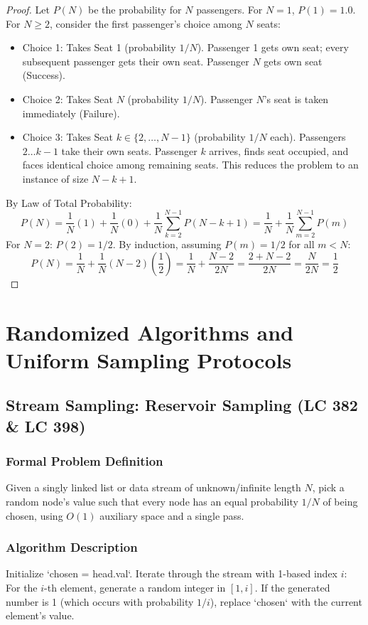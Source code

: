 \documentclass[10pt,journal,compsoc,onecolumn]{IEEEtran}
\begin{document}
\begin{proof}
Let $P(N)$ be the probability for $N$ passengers. For $N=1$, $P(1) = 1.0$.
For $N \ge 2$, consider the first passenger's choice among $N$ seats:
\begin{itemize}
    \item Choice 1: Takes Seat 1 (probability $1/N$). Passenger 1 gets own seat; every subsequent passenger gets their own seat. Passenger $N$ gets own seat (Success).
    \item Choice 2: Takes Seat $N$ (probability $1/N$). Passenger $N$'s seat is taken immediately (Failure).
    \item Choice 3: Takes Seat $k \in \{2, \dots, N-1\}$ (probability $1/N$ each). Passengers $2 \dots k-1$ take their own seats. Passenger $k$ arrives, finds seat occupied, and faces identical choice among remaining seats. This reduces the problem to an instance of size $N - k + 1$.
\end{itemize}
By Law of Total Probability:
\[
P(N) = \frac{1}{N}(1) + \frac{1}{N}(0) + \frac{1}{N} \sum_{k=2}^{N-1} P(N - k + 1) = \frac{1}{N} + \frac{1}{N} \sum_{m=2}^{N-1} P(m)
\]
For $N=2$: $P(2) = 1/2$. By induction, assuming $P(m) = 1/2$ for all $m < N$:
\[
P(N) = \frac{1}{N} + \frac{1}{N} (N - 2)\left(\frac{1}{2}\right) = \frac{1}{N} + \frac{N - 2}{2N} = \frac{2 + N - 2}{2N} = \frac{N}{2N} = \frac{1}{2}
\]
\end{proof}

\section{Randomized Algorithms and Uniform Sampling Protocols}
\label{sec:randomized-algorithms}

\subsection{Stream Sampling: Reservoir Sampling (LC 382 \& LC 398)}

\subsubsection{Formal Problem Definition}
Given a singly linked list or data stream of unknown/infinite length $N$, pick a random node's value such that every node has an equal probability $1/N$ of being chosen, using $O(1)$ auxiliary space and a single pass.

\subsubsection{Algorithm Description}
Initialize `chosen = head.val`. Iterate through the stream with 1-based index $i$:
For the $i$-th element, generate a random integer in $[1, i]$. If the generated number is 1 (which occurs with probability $1/i$), replace `chosen` with the current element's value.
\end{document}
